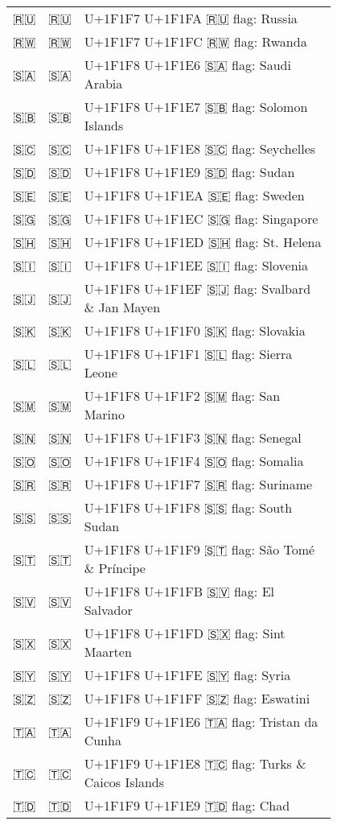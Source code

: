 \documentclass[a4paper,12pt]{ltjarticle}
\newcommand{\fontA}[1]{{\fontspec[RawFeature={mode=harf,+dist,+ccmp}]{Segoe UI Emoji} #1}}
\newcommand{\fontB}[1]{{\fontspec[RawFeature={mode=harf,+dist,+ccmp}]{Noto Color Emoji} #1}}
\begin{document}
\begin{longtable}[c]{ccp{0.8\linewidth}}
\fontA{🇷🇺}&\fontB{🇷🇺}&U+1F1F7 U+1F1FA 🇷🇺 flag: Russia\\
\fontA{🇷🇼}&\fontB{🇷🇼}&U+1F1F7 U+1F1FC 🇷🇼 flag: Rwanda\\
\fontA{🇸🇦}&\fontB{🇸🇦}&U+1F1F8 U+1F1E6 🇸🇦 flag: Saudi Arabia\\
\fontA{🇸🇧}&\fontB{🇸🇧}&U+1F1F8 U+1F1E7 🇸🇧 flag: Solomon Islands\\
\fontA{🇸🇨}&\fontB{🇸🇨}&U+1F1F8 U+1F1E8 🇸🇨 flag: Seychelles\\
\fontA{🇸🇩}&\fontB{🇸🇩}&U+1F1F8 U+1F1E9 🇸🇩 flag: Sudan\\
\fontA{🇸🇪}&\fontB{🇸🇪}&U+1F1F8 U+1F1EA 🇸🇪 flag: Sweden\\
\fontA{🇸🇬}&\fontB{🇸🇬}&U+1F1F8 U+1F1EC 🇸🇬 flag: Singapore\\
\fontA{🇸🇭}&\fontB{🇸🇭}&U+1F1F8 U+1F1ED 🇸🇭 flag: St. Helena\\
\fontA{🇸🇮}&\fontB{🇸🇮}&U+1F1F8 U+1F1EE 🇸🇮 flag: Slovenia\\
\fontA{🇸🇯}&\fontB{🇸🇯}&U+1F1F8 U+1F1EF 🇸🇯 flag: Svalbard \& Jan Mayen\\
\fontA{🇸🇰}&\fontB{🇸🇰}&U+1F1F8 U+1F1F0 🇸🇰 flag: Slovakia\\
\fontA{🇸🇱}&\fontB{🇸🇱}&U+1F1F8 U+1F1F1 🇸🇱 flag: Sierra Leone\\
\fontA{🇸🇲}&\fontB{🇸🇲}&U+1F1F8 U+1F1F2 🇸🇲 flag: San Marino\\
\fontA{🇸🇳}&\fontB{🇸🇳}&U+1F1F8 U+1F1F3 🇸🇳 flag: Senegal\\
\fontA{🇸🇴}&\fontB{🇸🇴}&U+1F1F8 U+1F1F4 🇸🇴 flag: Somalia\\
\fontA{🇸🇷}&\fontB{🇸🇷}&U+1F1F8 U+1F1F7 🇸🇷 flag: Suriname\\
\fontA{🇸🇸}&\fontB{🇸🇸}&U+1F1F8 U+1F1F8 🇸🇸 flag: South Sudan\\
\fontA{🇸🇹}&\fontB{🇸🇹}&U+1F1F8 U+1F1F9 🇸🇹 flag: São Tomé \& Príncipe\\
\fontA{🇸🇻}&\fontB{🇸🇻}&U+1F1F8 U+1F1FB 🇸🇻 flag: El Salvador\\
\fontA{🇸🇽}&\fontB{🇸🇽}&U+1F1F8 U+1F1FD 🇸🇽 flag: Sint Maarten\\
\fontA{🇸🇾}&\fontB{🇸🇾}&U+1F1F8 U+1F1FE 🇸🇾 flag: Syria\\
\fontA{🇸🇿}&\fontB{🇸🇿}&U+1F1F8 U+1F1FF 🇸🇿 flag: Eswatini\\
\fontA{🇹🇦}&\fontB{🇹🇦}&U+1F1F9 U+1F1E6 🇹🇦 flag: Tristan da Cunha\\
\fontA{🇹🇨}&\fontB{🇹🇨}&U+1F1F9 U+1F1E8 🇹🇨 flag: Turks \& Caicos Islands\\
\fontA{🇹🇩}&\fontB{🇹🇩}&U+1F1F9 U+1F1E9 🇹🇩 flag: Chad\\

\end{longtable}
\end{document}
